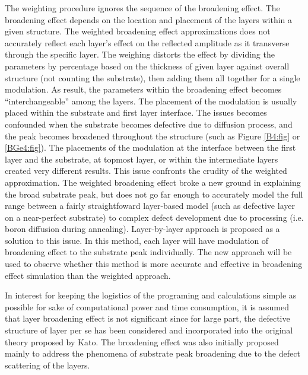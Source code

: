 The weighting procedure ignores the sequence of the broadening effect.   The broadening effect depends on the location and placement of the layers within a given structure.  The weighted broadening effect approximations does not accurately reflect each layer's effect on the reflected amplitude as it transverse through the specific layer.  The weighing distorts the effect by dividing the parameters by percentage based on the thickness of given layer against overall structure (not counting the substrate), then adding them all together for a single modulation.  As result, the parameters within the broadening effect becomes ``interchangeable'' among the layers.  The placement of the modulation is usually placed within the substrate and first layer interface.  The issues becomes confounded when the substrate becomes defective due to diffusion process, and the peak becomes broadened throughout the structure  (such as Figure \ref{B4:fig} or \ref{BGe4:fig}).  The placements of the modulation at the interface between the first layer and the substrate, at topmost layer, or within the intermediate layers created very different results.  This issue confronts the crudity of the weighted approximation.  The weighted broadening effect broke a new ground in explaining the broad substrate peak, but does not go far enough to accurately model the full range between a fairly straightfoward layer-based model (such as defective layer on a near-perfect substrate) to complex defect development due to processing (i.e. boron diffusion during annealing).   Layer-by-layer approach is proposed as a solution to this issue.  In this method, each layer will have modulation of broadening effect to the substrate peak individually.  The new approach will be used  to observe whether this method is more accurate and effective in broadening effect simulation than the weighted approach.

In interest for keeping the logistics of the programing and calculations simple as possible for sake of computational power and time consumption, it is assumed that layer broadening effect is not significant since for large part, the defective structure of layer per se has been considered and incorporated into the original theory proposed by Kato.  The broadening effect was also initially proposed mainly to address the phenomena of substrate peak broadening due to the defect scattering of the layers.

